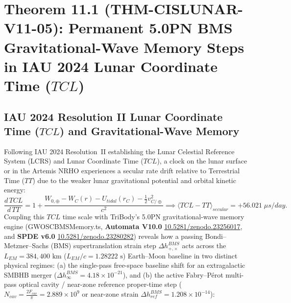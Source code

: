 \documentclass[11pt,a4paper,reqno]{article}
\def\bm#1{#1}%
\def\texttt#1{#1}%
\def\mathrm#1{#1}%
\def\mathcal#1{#1}%
\def\mathbb#1{#1}%
\newcommand{\zenodo}[1]{\href{https://doi.org/10.5281/zenodo.#1}{\texttt{10.5281/\allowbreak zenodo.#1}}}
\theoremstyle{plain}
\theoremstyle{definition}
\theoremstyle{remark}
\numberwithin{equation}{section}
\begin{document}
\section{\texorpdfstring{Theorem 11.1 (\texttt{THM-CISLUNAR-V11-05}): Permanent 5.0PN BMS Gravitational-Wave Memory Steps in IAU 2024 Lunar Coordinate Time ($\mathrm{TCL}$)}{Theorem 11.1 (THM-CISLUNAR-V11-05): Permanent 5.0PN BMS Gravitational-Wave Memory Steps in IAU 2024 Lunar Coordinate Time (TCL)}}
\label{sec:cislunar_v11_tcl_bms_memory}

\subsection{IAU 2024 Resolution II Lunar Coordinate Time (\texorpdfstring{$\mathrm{TCL}$}{TCL}) and Gravitational-Wave Memory}
Following IAU 2024 Resolution~II establishing the Lunar Celestial Reference System (LCRS) and Lunar Coordinate Time ($\mathrm{TCL}$), a clock on the lunar surface or in the Artemis NRHO experiences a secular rate drift relative to Terrestrial Time ($\mathrm{TT}$) due to the weaker lunar gravitational potential and orbital kinetic energy:
\begin{equation}
  \frac{\mathrm{d}\,\mathrm{TCL}}{\mathrm{d}\,\mathrm{TT}} = 1 + \frac{W_{0,\oplus} - W_{\mathbb{C}}(\bm{r}) - U_{\mathrm{tidal}}(\bm{r}_{\mathbb{C}}) - \frac{1}{2}v_{\mathbb{C}/\oplus}^2}{c^2} \implies \langle \mathrm{TCL} - \mathrm{TT} \rangle_{\mathrm{secular}} = \bm{+56.021\;\mu\mathrm{s/day}}.
  \label{eq:tcl_tt_secular_drift}
\end{equation}
Coupling this $\mathrm{TCL}$ time scale with TriBody's 5.0PN gravitational-wave memory engine (\texttt{GWOSCBMSMemory.ts}, \textbf{Automata V10.0} \zenodo{23256017}, and \textbf{SPDE v6.0} \zenodo{23280282}) reveals how a passing Bondi--Metzner--Sachs (BMS) supertranslation strain step $\Delta h_{+,\times}^{\mathrm{BMS}}$ acts across the $L_{\mathrm{EM}} = 384,400\text{ km}$ ($L_{\mathrm{EM}}/c = 1.28222\text{ s}$) Earth--Moon baseline in two distinct physical regimes: (a) the single-pass free-space baseline shift for an extragalactic SMBHB merger ($\Delta h_\infty^{\mathrm{BMS}} = 4.18 \times 10^{-21}$), and (b) the active Fabry--P\'erot multi-pass optical cavity / near-zone reference proper-time step ($N_{\mathrm{cav}} = \frac{2\mathcal{F}_{\mathrm{cav}}}{\pi} = 2.889 \times 10^9$ or near-zone strain $\Delta h_{\mathrm{ref}}^{\mathrm{BMS}} = 1.208 \times 10^{-14}$):
\end{document}
